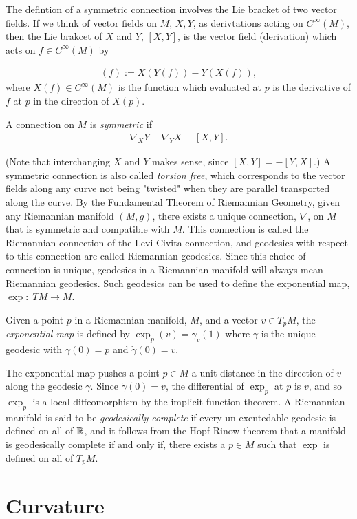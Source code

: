 The defintion of a symmetric connection involves the Lie bracket of two vector fields. If we think of vector fields on $M$, $X, Y$, as derivtations acting on $C^\infty (M)$, then the Lie brakcet of $X$ and $Y$, $[X , Y]$, is the vector field (derivation) which acts on $f \in C^\infty (M)$ by

\begin{align*}
[X , Y] (f) := X(Y(f)) - Y(X(f)),
\end{align*}
where $X(f) \in C^\infty (M)$ is the function which evaluated at $p$ is the derivative of $f$ at $p$ in the direction of $X(p)$. 

\begin{definition}
A connection on $M$ is \textit{symmetric} if 
\begin{align*}
\nabla_X Y - \nabla_Y X \equiv [X, Y].
\end{align*}
\end{definition}

(Note that interchanging $X$ and $Y$ makes sense, since $[X, Y] = - [Y, X]$.) A symmetric connection is also called \textit{torsion free}, which corresponds to the vector fields along any curve not being "twisted" when they are parallel transported along the curve. By the Fundamental Theorem of Riemannian Geometry, given any Riemannian manifold $(M,g)$, there exists a unique connection, $\nabla$, on $M$ that is symmetric and compatible with $M$. This connection is called the Riemannian connection of the Levi-Civita connection, and geodesics with respect to this connection are called Riemannian geodesics. Since this choice of connection is unique, geodesics in a Riemannian manifold will always mean Riemannian geodesics. Such geodesics can be used to define the exponential map, $\exp: \; TM \rightarrow M$.  

\begin{definition}
Given a point $p$ in a Riemannian manifold, $M$, and a vector $v \in T_p M$, the \textit{exponential map} is defined by $\exp_p (v) = \gamma_v(1)$ where $\gamma$ is the unique geodesic with $\gamma(0) = p$ and $\dot{\gamma}(0) = v$.
\end{definition}

The exponential map pushes a point $p \in M$ a unit distance in the direction of $v$ along the geodesic $\gamma$. Since $\dot{\gamma}(0) = v$, the differential of $\exp_p$ at $p$ is $v$, and so $\exp_p$ is a local diffeomorphism by the implicit function theorem. A Riemannian manifold is said to be \textit{geodesically complete} if every un-exentedable geodesic is defined on all of $\mathbb{R}$, and it follows from the Hopf-Rinow theorem that a manifold is geodesically complete if and only if, there exists a $p \in M$ such that $\exp$ is defined on all of $T_p M$. 

\section{Curvature}




\newpage
\thispagestyle{empty}
\cleartooddpage

